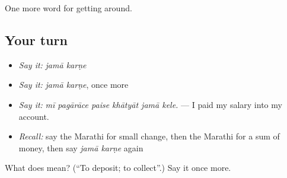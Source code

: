 \begin{grammarlens}[title={What you've built}]
One more word for getting around.
\end{grammarlens}

\subsection*{Your turn}
\begin{itemize}
\raggedright
  \item \emph{Say it:} \emph{jamā karṇe}
  \item \emph{Say it:} \emph{jamā karṇe}, once more
  \item \emph{Say it:} \emph{mī pagārāce paise khātyāt jamā kele.} — I paid my salary into my account.
  \item \emph{Recall:} say the Marathi for small change, then the Marathi for a sum of money, then say \emph{jamā karṇe} again
\end{itemize}

\begin{tcolorbox}[breakable,colback=teal!4,colframe=teal!35!black,title={Before you move on}]
What does   mean? (\textquotedblleft{}To deposit; to collect\textquotedblright{}.) Say it once more.
\end{tcolorbox}
